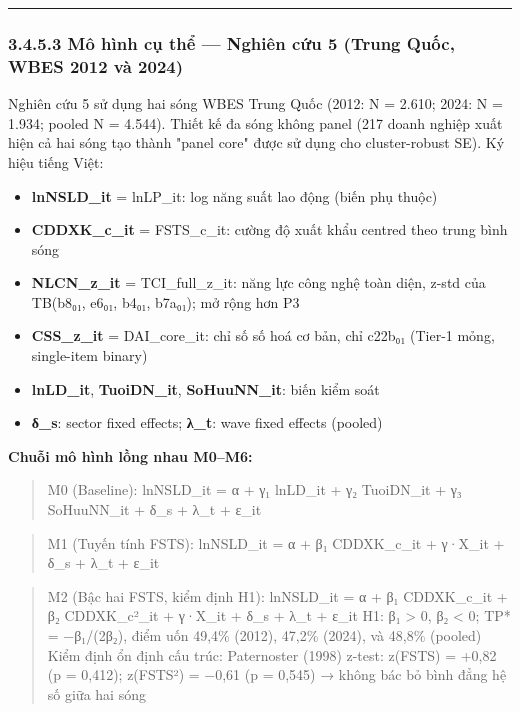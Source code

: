 \documentclass[12pt,a4paper]{article}
\providecommand{\tightlist}{\setlength{\itemsep}{0pt}\setlength{\parskip}{0pt}}
\begin{document}
\begin{center}\rule{0.5\linewidth}{0.5pt}\end{center}

\hypertarget{3453-muxf4-huxecnh-cux1ee5-thux1ec3--nghiuxean-cux1ee9u-5-trung-quux1ed1c-wbes-2012-vuxe0-2024}{%
\subsubsection{3.4.5.3 Mô hình cụ thể --- Nghiên cứu 5 (Trung Quốc, WBES
2012 và
2024)}\label{3453-muxf4-huxecnh-cux1ee5-thux1ec3--nghiuxean-cux1ee9u-5-trung-quux1ed1c-wbes-2012-vuxe0-2024}}

Nghiên cứu 5 sử dụng hai sóng WBES Trung Quốc (2012: N = 2.610; 2024: N
= 1.934; pooled N = 4.544). Thiết kế đa sóng không panel (217 doanh
nghiệp xuất hiện cả hai sóng tạo thành "panel core" được sử dụng cho
cluster-robust SE). Ký hiệu tiếng Việt:

\begin{itemize}
\tightlist
\item
  \textbf{lnNSLD\_it} = lnLP\_it: log năng suất lao động (biến phụ
  thuộc)
\item
  \textbf{CDDXK\_c\_it} = FSTS\_c\_it: cường độ xuất khẩu centred theo
  trung bình sóng
\item
  \textbf{NLCN\_z\_it} = TCI\_full\_z\_it: năng lực công nghệ toàn diện,
  z-std của TB(b8₀₁, e6₀₁, b4₀₁, b7a₀₁); mở rộng hơn P3
\item
  \textbf{CSS\_z\_it} = DAI\_core\_it: chỉ số số hoá cơ bản, chỉ c22b₀₁
  (Tier-1 mỏng, single-item binary)
\item
  \textbf{lnLD\_it}, \textbf{TuoiDN\_it}, \textbf{SoHuuNN\_it}: biến
  kiểm soát
\item
  \textbf{δ\_s}: sector fixed effects; \textbf{λ\_t}: wave fixed effects
  (pooled)
\end{itemize}

\textbf{Chuỗi mô hình lồng nhau M0--M6:}

\begin{quote}
M0 (Baseline): lnNSLD\_it = α + γ₁ lnLD\_it + γ₂ TuoiDN\_it + γ₃
SoHuuNN\_it + δ\_s + λ\_t + ε\_it
\end{quote}

\begin{quote}
M1 (Tuyến tính FSTS): lnNSLD\_it = α + β₁ CDDXK\_c\_it + γ·X\_it + δ\_s
+ λ\_t + ε\_it
\end{quote}

\begin{quote}
M2 (Bậc hai FSTS, kiểm định H1): lnNSLD\_it = α + β₁ CDDXK\_c\_it + β₂
CDDXK\_c²\_it + γ·X\_it + δ\_s + λ\_t + ε\_it H1: β₁ \textgreater{} 0,
β₂ \textless{} 0; TP* = −β₁/(2β₂), điểm uốn 49,4\% (2012), 47,2\%
(2024), và 48,8\% (pooled) Kiểm định ổn định cấu trúc: Paternoster
(1998) z-test: z(FSTS) = +0,82 (p = 0,412); z(FSTS²) = −0,61 (p = 0,545)
→ không bác bỏ bình đẳng hệ số giữa hai sóng
\end{quote}
\end{document}
